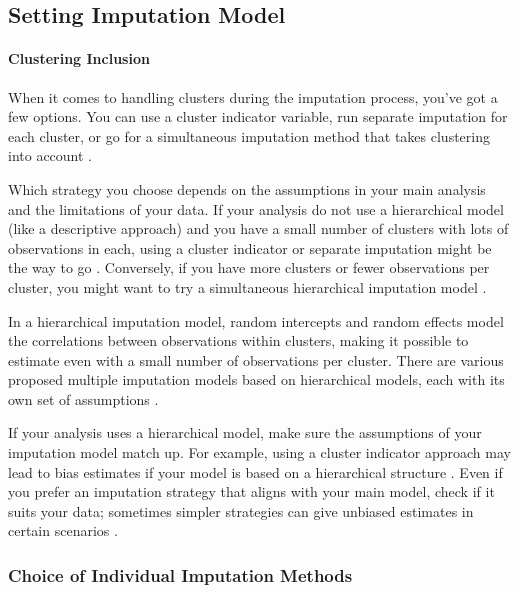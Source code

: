 \documentclass[
  article]{jss}
\let\oldparagraph\paragraph
\renewcommand{\paragraph}[1]{\oldparagraph{#1}\mbox{}}
\begin{document}
\hypertarget{setting-imputation-model}{%
\subsection{Setting Imputation Model}\label{setting-imputation-model}}

\hypertarget{clustering-inclusion}{%
\paragraph{Clustering Inclusion}\label{clustering-inclusion}}

When it comes to handling clusters during the imputation process, you've
got a few options. You can use a cluster indicator variable, run
separate imputation for each cluster, or go for a simultaneous
imputation method that takes clustering into account \cite{eddings}.

Which strategy you choose depends on the assumptions in your main
analysis and the limitations of your data. If your analysis do not use a
hierarchical model (like a descriptive approach) and you have a small
number of clusters with lots of observations in each, using a cluster
indicator or separate imputation might be the way to go
\cite{graham2009}. Conversely, if you have more clusters or fewer
observations per cluster, you might want to try a simultaneous
hierarchical imputation model \cite{Allison_2002}.

In a hierarchical imputation model, random intercepts and random effects
model the correlations between observations within clusters, making it
possible to estimate even with a small number of observations per
cluster. There are various proposed multiple imputation models based on
hierarchical models, each with its own set of assumptions
\cite{audigier}.

If your analysis uses a hierarchical model, make sure the assumptions of
your imputation model match up. For example, using a cluster indicator
approach may lead to bias estimates if your model is based on a
hierarchical structure \cite{taljaard2008,speidel2018}. Even if you
prefer an imputation strategy that aligns with your main model, check if
it suits your data; sometimes simpler strategies can give unbiased
estimates in certain scenarios \cite{bailey2020}.

\hypertarget{choice-of-individual-imputation-methods}{%
\subsubsection{Choice of Individual Imputation
Methods}\label{choice-of-individual-imputation-methods}}
\end{document}
